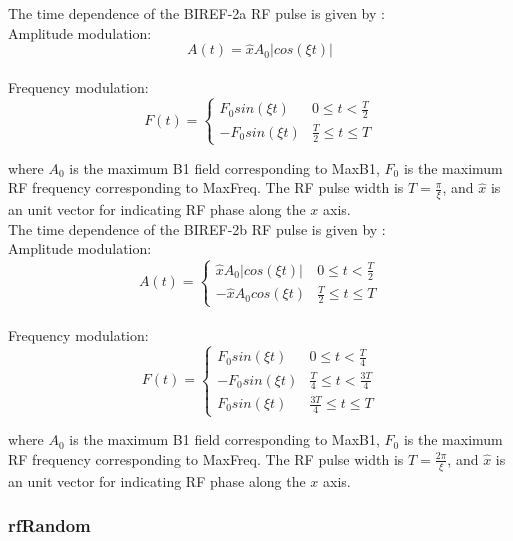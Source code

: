 \documentclass{book}%
\begin{document}
The time dependence of the BIREF-2a RF pulse is given by \cite{Handbook2004}: \\
Amplitude modulation:
\begin{equation}
A(t) = \hat{x} A_0 |cos(\xi t)|
\label{eq:BIREF2aA}
\end{equation}
\\
Frequency modulation:
\begin{equation}
F(t) = 
\begin{cases}
 F_0 sin(\xi t)  &  0 \leq t < \frac{T}{2} \\
 -F_0 sin(\xi t)  &  \frac{T}{2} \leq t \leq T
\end{cases}
\label{eq:BIREF2aF}
\end{equation}

where $A_0$ is the maximum B1 field corresponding to MaxB1, $F_0$ is the maximum RF frequency corresponding to MaxFreq. The RF pulse width is $T = \frac{\pi}{\xi}$, and $\hat{x}$ is an unit vector for indicating RF phase along the $x$ axis. \\

The time dependence of the BIREF-2b RF pulse is given by \cite{Handbook2004}: \\
Amplitude modulation:
\begin{equation}
A(t) = 
\begin{cases}
 \hat{x} A_0 |cos(\xi t)|  &  0 \leq t < \frac{T}{2} \\
 -\hat{x} A_0 cos(\xi t)  &  \frac{T}{2} \leq t \leq T
\end{cases}
\label{eq:BIREF2bA}
\end{equation}
\\
Frequency modulation:
\begin{equation}
F(t) = 
\begin{cases}
 F_0 sin(\xi t)  &  0 \leq t < \frac{T}{4} \\
 -F_0 sin(\xi t)  &  \frac{T}{4} \leq t < \frac{3T}{4} \\
 F_0 sin(\xi t)  &  \frac{3T}{4} \leq t \leq T
\end{cases}
\label{eq:BIREF2bF}
\end{equation}

where $A_0$ is the maximum B1 field corresponding to MaxB1, $F_0$ is the maximum RF frequency corresponding to MaxFreq. The RF pulse width is $T = \frac{2\pi}{\xi}$, and $\hat{x}$ is an unit vector for indicating RF phase along the $x$ axis. \\

\subsubsection{rfRandom}
\end{document}
